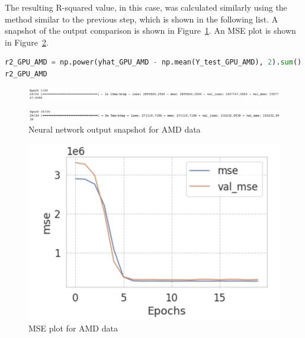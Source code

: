 \documentclass{scrartcl}
\begin{document}
\noindent The resulting R-squared value, in this case, was calculated similarly using the method similar to the previous step, which is shown in the following list. A snapshot of the output comparison is shown in Figure~\ref{fig:NN18-19}. An MSE plot is shown in Figure~\ref{fig:NN17}. \\

\begin{lstlisting}[language=Python, caption= Code output for MSE AMD training,basicstyle=\tiny,captionpos=b]
r2_GPU_AMD = np.power(yhat_GPU_AMD - np.mean(Y_test_GPU_AMD), 2).sum() / np.power(Y_test_GPU_AMD - np.mean(Y_test_GPU_AMD), 2).sum()
r2_GPU_AMD

\end{lstlisting}

\newpage

\begin{figure}[H]
         \centering
         \includegraphics[width=\textwidth]{Graphics/Neural Network Images/NN18.png}
\end{figure}
     
\begin{figure}[H]
         \centering
         \includegraphics[width=\textwidth]{Graphics/Neural Network Images/NN19.png}
         \caption{Neural network output snapshot for AMD data}
         \label{fig:NN18-19}
\end{figure}


\begin{figure}[H]
	\begin{center}
		\includegraphics[scale=1.0]{Graphics/Neural Network Images/NN17.png}
	\end{center}
	\caption{MSE plot for AMD data}
	\label{fig:NN17}
\end{figure}
\end{document}
